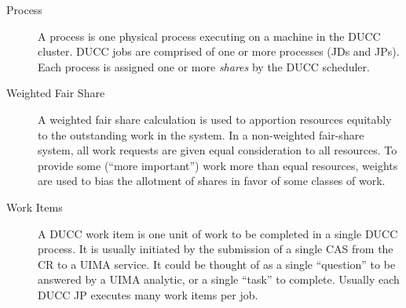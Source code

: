 \begin{description}
\item[Process]A process is one physical process executing on a machine in the DUCC cluster. DUCC
  jobs are comprised of one or more processes (JDs and JPs).  Each process is assigned one or
  more {\em shares} by the DUCC scheduler.

\item[Weighted Fair Share] A weighted fair share calculation is used to apportion resources
  equitably to the outstanding work in the system.  In a non-weighted fair-share system, all
  work requests are given equal consideration to all resources.  To provide some (``more important'')
  work more than equal resources, weights are used to bias the allotment of shares in favor of
  some classes of work.

\item[Work Items] A DUCC work item is one unit of work to be completed in a single DUCC process. It
  is usually initiated by the submission of a single CAS from the CR to a UIMA service. It could be
  thought of as a single ``question'' to be answered by a UIMA analytic, or a single ``task'' to
  complete. Usually each DUCC JP executes many work items per job.
\end{description}


